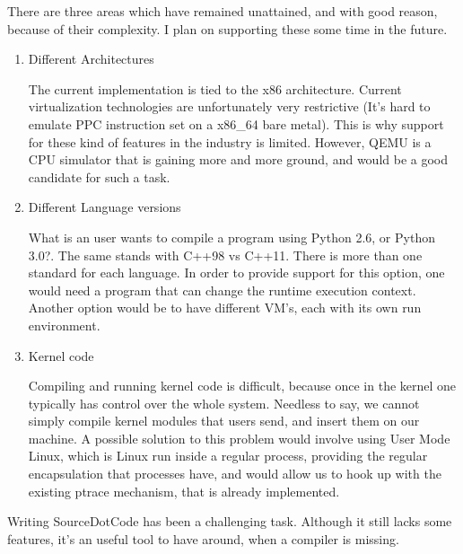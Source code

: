 
There are three areas which have remained unattained, and with good reason, because of their complexity.
I plan on supporting these some time in the future.

\begin{enumerate}

\item{Different Architectures}

The current implementation is tied to the x86 architecture.
Current virtualization technologies are unfortunately very restrictive (It's hard to emulate PPC instruction set on a x86_64 bare metal).
This is why support for these kind of features in the industry is limited.
However, QEMU is a CPU simulator that is gaining more and more ground, and would be a good candidate for such a task.

\item{Different Language versions}

What is an user wants to compile a program using Python 2.6, or Python 3.0?. The same stands with C++98 vs C++11.
There is more than one standard for each language.
In order to provide support for this option, one would need a program that can change the runtime execution context.
Another option would be to have different VM's, each with its own run environment. 

\item{Kernel code}

Compiling and running kernel code is difficult, because once in the kernel one typically has control over the whole system.
Needless to say, we cannot simply compile kernel modules that users send, and insert them on our machine.
A possible solution to this problem would involve using User Mode Linux, which is Linux run inside a regular process, providing the regular encapsulation that processes have, and would allow us to hook up with the existing ptrace mechanism, that is already implemented.
\end{enumerate}


Writing SourceDotCode has been a challenging task. Although it still lacks some features, it's an useful tool to have around, when a compiler is missing.
